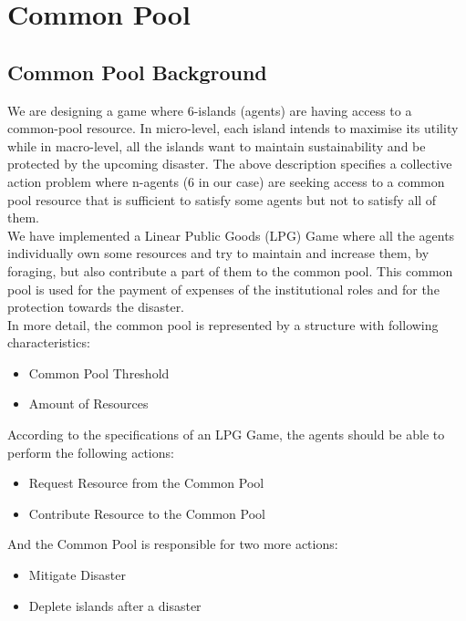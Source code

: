 \section{Common Pool}
\subsection{Common Pool Background}

We are designing a game where 6-islands (agents) are having access to a common-pool resource. In micro-level, each island intends to maximise its utility while in macro-level, all the islands want to maintain sustainability and be protected by the upcoming disaster. The above description specifies a collective action problem where n-agents (6 in our case) are seeking access to a common pool resource that is sufficient to satisfy some agents but not to satisfy all of them.\\

We have implemented a Linear Public Goods (LPG) Game where all the agents individually own some resources and try to maintain and increase them, by foraging, but also contribute a part of them to the common pool. This common pool is used for the payment of expenses of the institutional roles and for the protection towards the disaster.\\

In more detail, the common pool is represented by a structure with following characteristics:

\begin{itemize}
    \item Common Pool Threshold
    \item Amount of Resources 
\end{itemize}

According to the specifications of an LPG Game, the agents should be able to perform the following actions:  

\begin{itemize}
    \item Request Resource from the Common Pool 
    \item Contribute Resource to the Common Pool 
\end{itemize}

And the Common Pool is responsible for two more actions: 

\begin{itemize}
    \item Mitigate Disaster
    \item Deplete islands after a disaster
\end{itemize}

